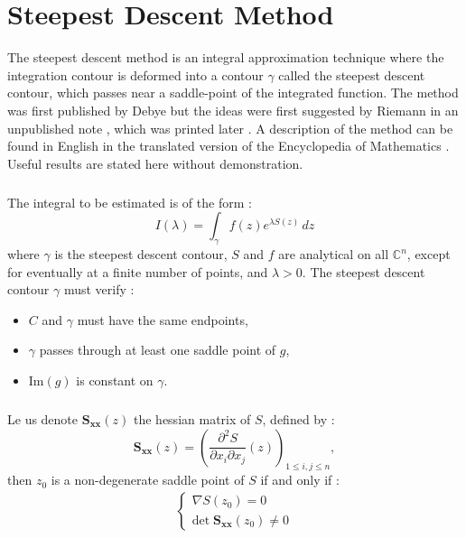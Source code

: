 \chapter{Steepest Descent Method}
\label{PhaseStationnaire}
The steepest descent method is an integral approximation technique where the integration contour is deformed into a contour $\gamma$ called the steepest descent contour, which passes near a saddle-point of the integrated function. The method was first published by Debye \cite{Debye} but the ideas were first suggested by Riemann in an unpublished note \cite{RiemannUnpub}, which was printed later \cite{Riemann}. A description of the method can be found in English in the translated version of the Encyclopedia of Mathematics \cite{Encycl}. Useful results are stated here without demonstration.

\paragraph{}
The integral to be estimated is of the form :
\begin{equation}
I(\lambda)=\int_{\gamma} f(z)e^{\lambda S(z)}\,dz
\end{equation}
where $\gamma$ is the steepest descent contour, $S$ and $f$ are analytical on all $\mathbb{C}^n$, except for eventually at a finite number of points, and $\lambda>0$. The steepest descent contour $\gamma$ must verify :
\begin{itemize}
\item $C$ and $\gamma$ must have the same endpoints,
\item $\gamma$ passes through at least one saddle point of $g$,
\item Im$(g)$ is constant on $\gamma$.
\end{itemize}

\paragraph{}
Le us denote $\mathbf{S_{xx}}(z)$ the hessian matrix of $S$, defined by :
\begin{equation}
\mathbf{S_{xx}}(z)=\left( \frac{\partial^2 S}{\partial x_i \partial x_j}(z) \right)_{1\leq i,j \leq n},
\end{equation}
then $z_ 0$ is a non-degenerate saddle point of $S$ if and only if :
\begin{eqnarray}
\left\{
\begin{array}{l}
\nabla S(z_0)=0 \\
\mbox{det} \; \mathbf{S_{xx}}(z_0) \neq 0
\end{array}
\right.
\end{eqnarray}

